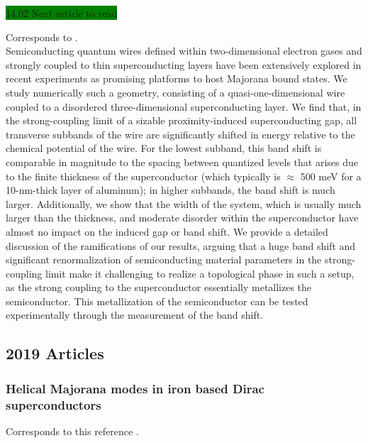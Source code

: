 \colorbox{green}{14.02 Next article to read}

Corresponds to \cite{PhysRevB.97.165425}.\\

Semiconducting quantum wires defined within two-dimensional electron gases and strongly coupled to thin superconducting layers have been extensively explored in recent experiments as promising platforms to host Majorana bound states. We study numerically such a geometry, consisting of a quasi-one-dimensional wire coupled to a disordered three-dimensional superconducting layer. We find that, in the strong-coupling limit of a sizable proximity-induced superconducting gap, all transverse subbands of the wire are significantly shifted in energy relative to the chemical potential of the wire. For the lowest subband, this band shift is comparable in magnitude to the spacing between quantized levels that arises due to the finite thickness of the superconductor (which typically is $\approx$ 500 meV for a 10-nm-thick layer of aluminum); in higher subbands, the band shift is much larger. Additionally, we show that the width of the system, which is usually much larger than the thickness, and moderate disorder within the superconductor have almost no impact on the induced gap or band shift. We provide a detailed discussion of the ramifications of our results, arguing that a huge band shift and significant renormalization of semiconducting material parameters in the strong-coupling limit make it challenging to realize a topological phase in such a setup, as the strong coupling to the superconductor essentially metallizes the semiconductor. This metallization of the semiconductor can be tested experimentally through the measurement of the band shift.

\subsection{2019 Articles}

\subsubsection{Helical Majorana modes in iron based Dirac superconductors}

Corresponds to this reference \cite{2019Coleman}.\\

